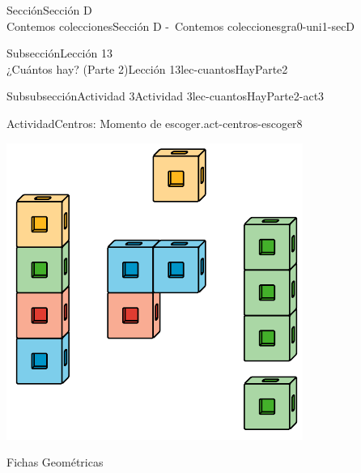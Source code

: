 \begin{sectionptx}{Sección}{{\Large Sección D\\}Contemos colecciones}{}{Sección D -~Contemos colecciones}{}{}{gra0-uni1-secD}
\begin{subsectionptx}{Subsección}{{\normalsize Lección 13\\[-0.05cm]}¿Cuántos hay? (Parte 2)}{}{Lección 13}{}{}{lec-cuantosHayParte2}
\begin{subsubsectionptx}{Subsubsección}{Actividad 3}{}{Actividad 3}{}{}{lec-cuantosHayParte2-act3}
\begin{activity}{Actividad}{Centros: Momento de escoger.}{act-centros-escoger8}
\begin{sidebyside}{2}{0.025}{0.025}{0.05}
\begin{sbspanel}{0.45}
\includegraphics[max width=\linewidth, center]{external/svg-source/tikz-file-128850.pdf}
\end{sbspanel}%
\begin{sbspanel}{0.45}%
Fichas Geométricas%
\par

\end{sbspanel}
\end{sidebyside}
\end{activity}
\end{subsubsectionptx}
\end{subsectionptx}
\end{sectionptx}
